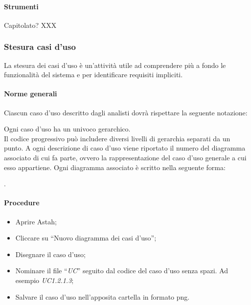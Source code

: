 \paragraph{Strumenti}
Capitolato? XXX



\subsubsection{Stesura casi d'uso}
La stesura dei casi d'uso è un'attività utile ad comprendere più a fondo le funzionalità del sistema e per identificare requisiti impliciti.

\paragraph{Norme generali}

Ciascun caso d'uso descritto dagli analisti dovrà rispettare la seguente notazione:
\begin{center}
\end{center}
Ogni caso d'uso ha un  univoco gerarchico.\\
Il codice progressivo può includere diversi livelli di gerarchia separati da un punto.
A ogni descrizione di caso d'uso viene riportato il numero del diagramma associato di cui fa parte, ovvero la rappresentazione del caso d'uso generale a cui esso appartiene.
Ogni diagramma associato è scritto nella seguente forma:
\begin{center}
.
\end{center}

\paragraph{Procedure}
\begin{itemize}
\item Aprire Astah;
\item Cliccare su ``Nuovo diagramma dei casi d'uso'';
\item Disegnare il caso d'uso;
\item Nominare il file ``\textit{UC}'' seguito dal codice del caso d'uso senza spazi. Ad esempio \textit{UC1.2.1.3};
\item Salvare il caso d'uso nell'apposita cartella in formato png.

\end{itemize}


